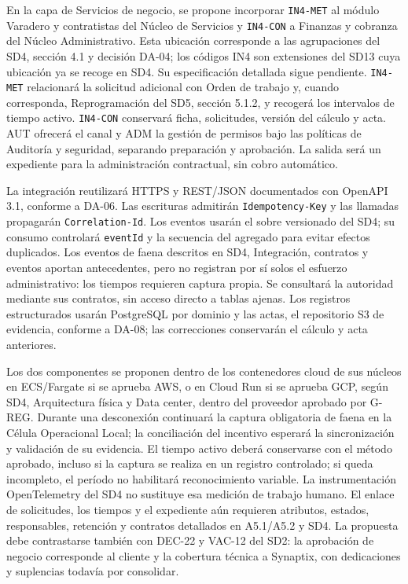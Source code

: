 En la capa de Servicios de negocio, se propone incorporar \texttt{IN4-MET} al módulo Varadero y contratistas del Núcleo de Servicios y \texttt{IN4-CON} a Finanzas y cobranza del Núcleo Administrativo. Esta ubicación corresponde a las agrupaciones del SD4, sección 4.1 y decisión DA-04; los códigos IN4 son extensiones del SD13 cuya ubicación ya se recoge en SD4. Su especificación detallada sigue pendiente. \texttt{IN4-MET} relacionará la solicitud adicional con Orden de trabajo y, cuando corresponda, Reprogramación del SD5, sección 5.1.2, y recogerá los intervalos de tiempo activo. \texttt{IN4-CON} conservará ficha, solicitudes, versión del cálculo y acta. AUT ofrecerá el canal y ADM la gestión de permisos bajo las políticas de Auditoría y seguridad, separando preparación y aprobación. La salida será un expediente para la administración contractual, sin cobro automático.

La integración reutilizará HTTPS y REST/JSON documentados con OpenAPI 3.1, conforme a DA-06. Las escrituras admitirán \texttt{Idempotency-Key} y las llamadas propagarán \texttt{Correlation-Id}. Los eventos usarán el sobre versionado del SD4; su consumo controlará \texttt{eventId} y la secuencia del agregado para evitar efectos duplicados. Los eventos de faena descritos en SD4, Integración, contratos y eventos aportan antecedentes, pero no registran por sí solos el esfuerzo administrativo: los tiempos requieren captura propia. Se consultará la autoridad mediante sus contratos, sin acceso directo a tablas ajenas. Los registros estructurados usarán PostgreSQL por dominio y las actas, el repositorio S3 de evidencia, conforme a DA-08; las correcciones conservarán el cálculo y acta anteriores.

Los dos componentes se proponen dentro de los contenedores cloud de sus núcleos en ECS/Fargate si se aprueba AWS, o en Cloud Run si se aprueba GCP, según SD4, Arquitectura física y Data center, dentro del proveedor aprobado por G-REG. Durante una desconexión continuará la captura obligatoria de faena en la Célula Operacional Local; la conciliación del incentivo esperará la sincronización y validación de su evidencia. El tiempo activo deberá conservarse con el método aprobado, incluso si la captura se realiza en un registro controlado; si queda incompleto, el período no habilitará reconocimiento variable. La instrumentación OpenTelemetry del SD4 no sustituye esa medición de trabajo humano. El enlace de solicitudes, los tiempos y el expediente aún requieren atributos, estados, responsables, retención y contratos detallados en A5.1/A5.2 y SD4. La propuesta debe contrastarse también con DEC-22 y VAC-12 del SD2: la aprobación de negocio corresponde al cliente y la cobertura técnica a Synaptix, con dedicaciones y suplencias todavía por consolidar.

